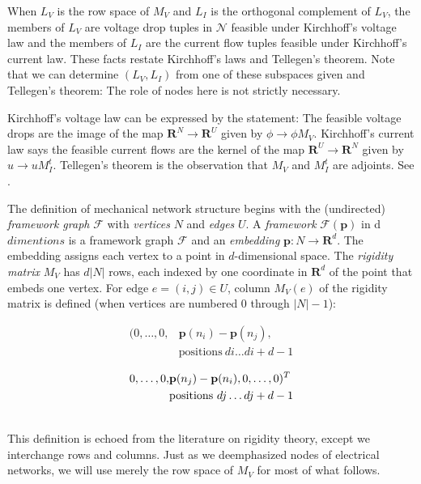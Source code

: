 \documentclass{article}
\def\Reals{\ensuremath{\mathbf R}}
\newcommand{\extra}[1]{{\small{#1}}}
\begin{document}
When $L_V$ is the row space of $M_V$ and $L_I$ is the orthogonal complement
of $L_V$, the members of $L_V$ are voltage drop tuples in $\mathcal{N}$ 
feasible under Kirchhoff's voltage law and the members of $L_I$ are the 
current flow tuples feasible under Kirchhoff's current law.  These facts 
restate Kirchhoff's laws and Tellegen's theorem.  Note that we can determine
$(L_V, L_I)$ from one of these subspaces given and Tellegen's theorem: The
role of nodes here is not strictly necessary.

\extra{ Kirchhoff's voltage law can be expressed by the statement:  
The feasible voltage drops are the image of the map 
$\Reals^N\rightarrow\Reals^U$ given by $\phi\rightarrow\phi M_V$.  
Kirchhoff's current law says the feasible current flows are the kernel
of the map $\Reals^U\rightarrow\Reals^N$ given by $u\rightarrow u M_I^t$.
Tellegen's theorem is the observation that $M_V$ and $M_I^t$ are adjoints.
See \cite{WyattTele}.}

The definition of mechanical network structure begins with the 
(undirected) \textit{framework graph} $\mathcal{F}$ with \textit{vertices}
$N$ and \textit{edges} $U$.  A \textit{framework} $\mathcal{F}(\mathbf{p})$ 
in d $dimentions$ is a framework graph $\mathcal{F}$ and an \textit{embedding} 
$\mathbf{p}:N\rightarrow \Reals^d$.  
The embedding assigns each vertex to a point in
$d$-dimensional space.  The \textit{rigidity matrix} $M_V$ 
has $d|N|$ rows, each
indexed by one coordinate in $\Reals^d$ of the point that embeds one vertex.
For edge $e=(i,j)\in U$, column $M_V(e)$ of the rigidity matrix is defined 
(when vertices are numbered 0 through $|N|-1$):\\
\begin{minipage}{\linewidth}
\begin{align*}
(0, \ldots,0, &\mathbf{p}(n_i)-\mathbf{p}(n_j),\\
              &\mathrm{positions\ } di\ldots di+d-1
\end{align*}
\end{minipage}
\hfill\begin{minipage}{.85\linewidth}
\begin{align*}
\hfill 0,\ldots,0,&\mathbf{p}(n_j)-\mathbf{p}(n_i), 0, \ldots,0)^T\\
                  &\mathrm{positions\ } dj\ldots dj+d-1
\end{align*}
      \end{minipage}\\
This definition is echoed from the literature \cite{RigidityBook} on rigidity theory, except
we interchange rows and columns.  Just as we deemphasized nodes of electrical
networks, we will use merely the row space of $M_V$ for most of what follows.
\end{document}

